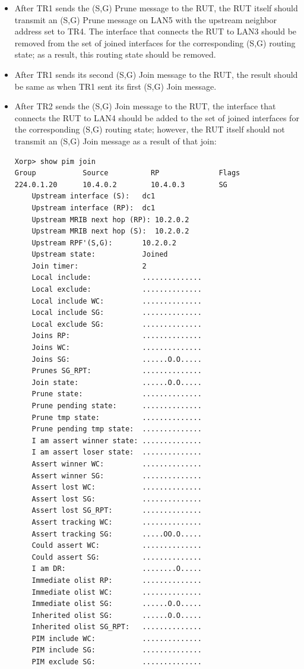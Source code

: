 \documentclass[11pt]{report}
\begin{document}
\begin{itemize}
  \item After TR1 sends the (S,G) Prune message to the RUT, the RUT itself
  should transmit an (S,G) Prune message on LAN5 with the upstream neighbor
  address set to TR4. The interface that connects the RUT to LAN3 should be
  removed from the set of joined interfaces for the corresponding (S,G)
  routing state; as a result, this routing state should be removed.

  \item After TR1 sends its second (S,G) Join message to the RUT, the
  result should be same as when TR1 sent its first (S,G) Join message.

  \item After TR2 sends the (S,G) Join message to the RUT, the interface
  that connects the RUT to LAN4 should be added to the set of joined
  interfaces for the corresponding (S,G) routing state; however, the RUT
  itself should not transmit an (S,G) Join message as a result of that
  join:

\begin{verbatim}
Xorp> show pim join 
Group           Source          RP              Flags
224.0.1.20      10.4.0.2        10.4.0.3        SG   
    Upstream interface (S):   dc1
    Upstream interface (RP):  dc1
    Upstream MRIB next hop (RP): 10.2.0.2
    Upstream MRIB next hop (S):  10.2.0.2
    Upstream RPF'(S,G):       10.2.0.2
    Upstream state:           Joined 
    Join timer:               2
    Local include:            ..............
    Local exclude:            ..............
    Local include WC:         ..............
    Local include SG:         ..............
    Local exclude SG:         ..............
    Joins RP:                 ..............
    Joins WC:                 ..............
    Joins SG:                 ......O.O.....
    Prunes SG_RPT:            ..............
    Join state:               ......O.O.....
    Prune state:              ..............
    Prune pending state:      ..............
    Prune tmp state:          ..............
    Prune pending tmp state:  ..............
    I am assert winner state: ..............
    I am assert loser state:  ..............
    Assert winner WC:         ..............
    Assert winner SG:         ..............
    Assert lost WC:           ..............
    Assert lost SG:           ..............
    Assert lost SG_RPT:       ..............
    Assert tracking WC:       ..............
    Assert tracking SG:       .....OO.O.....
    Could assert WC:          ..............
    Could assert SG:          ..............
    I am DR:                  ........O.....
    Immediate olist RP:       ..............
    Immediate olist WC:       ..............
    Immediate olist SG:       ......O.O.....
    Inherited olist SG:       ......O.O.....
    Inherited olist SG_RPT:   ..............
    PIM include WC:           ..............
    PIM include SG:           ..............
    PIM exclude SG:           ..............
\end{verbatim}


\end{itemize}
\end{document}
